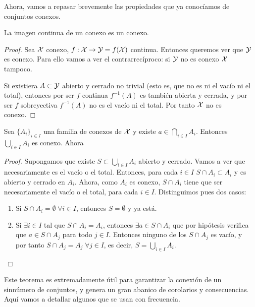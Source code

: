 Ahora, vamos a repasar brevemente las propiedades que ya conocíamos de conjuntos conexos.

\begin{prop}
	La imagen continua de un conexo es un conexo.
	
	\begin{proof}
		Sea $\mathcal{X}$ conexo, $f:\mathcal{X}\to\mathcal{Y}=f(\mathcal{X})$ continua. Entonces queremos ver que $\mathcal{Y}$ es conexo. Para ello vamos a ver el contrarrecíproco: si $\mathcal{Y}$ no es conexo $\mathcal{X}$ tampoco.
		
		Si existiera $A\subset\mathcal{Y}$ abierto y cerrado no trivial (esto es, que no es ni el vacío ni el total), entonces por ser $f$ continua $f^{-1}(A)$ es también abierta y cerrada, y por ser $f$ sobreyectiva $f^{-1}(A)$ no es el vacío ni el total. Por tanto $\mathcal{X}$ no es conexo.
	\end{proof}
\end{prop}

\begin{theo}
	\label{conex_theo_pivote}
	Sea $\{A_i\}_{i\in I}$ una familia de conexos de $\mathcal{X}$ y existe $a\in\bigcap_{i\in I} A_i$. Entonces $\bigcup_{i\in I} A_i$ es conexo. Ahora
	
	\begin{proof}
		Supongamos que existe $S\subset\bigcup_{i\in I} A_i$ abierto y cerrado. Vamos a ver que necesariamente es el vacío o el total. Entonces, para cada $i\in I$ $S\cap A_i\subset A_i$ y es abierto y cerrado en $A_i$. Ahora, como $A_i$ es conexo, $S\cap A_i$ tiene que ser necesariamente el vacío o el total, para cada $i\in I$. Distinguimos pues dos casos:
		\begin{enumerate}
			\item Si $S\cap A_i=\emptyset\;\forall i\in I$, entonces $S=\emptyset$ y ya está.
			\item Si $\exists i\in I$ tal que $S\cap A_i=A_i$, entonces $\exists a\in S\cap A_i$ que por hipótesis verifica que $a\in S\cap A_j$ para todo $j\in I$. Entonces ninguno de los $S\cap A_j$ es vacío, y por tanto $S\cap A_j=A_j\;\forall j\in I$, es decir, $S=\bigcup_{i\in I} A_i$. \qedhere
		\end{enumerate}
	\end{proof}
\end{theo}

Este teorema es extremadamente útil para garantizar la conexión de un sinnúmero de conjuntos, y genera un gran abanico de corolarios y consecuencias. Aquí vamos a detallar algunos que se usan con frecuencia.

